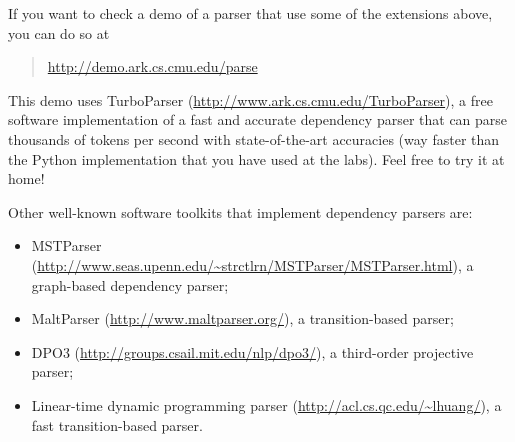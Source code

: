 If you want to check a demo of a parser that use some of the extensions above, you can do so 
at 
\begin{quote}
{\url{http://demo.ark.cs.cmu.edu/parse}} 
\end{quote}
This demo uses  
TurboParser ({\url{http://www.ark.cs.cmu.edu/TurboParser}}), a free software implementation of a fast and accurate dependency parser 
that can parse thousands of tokens per second with state-of-the-art accuracies 
(way faster than the Python implementation that you have used at the labs). 
Feel free to try it at home!

Other well-known software toolkits that implement dependency parsers are:
\begin{itemize}
\item MSTParser ({\url{http://www.seas.upenn.edu/~strctlrn/MSTParser/MSTParser.html}}), a graph-based dependency parser;
\item MaltParser ({\url{http://www.maltparser.org/}}), a transition-based parser;
\item DPO3 ({\url{http://groups.csail.mit.edu/nlp/dpo3/}}), a third-order projective parser;
\item Linear-time dynamic programming parser ({\url{http://acl.cs.qc.edu/~lhuang/}}), a fast transition-based parser.
\end{itemize}









